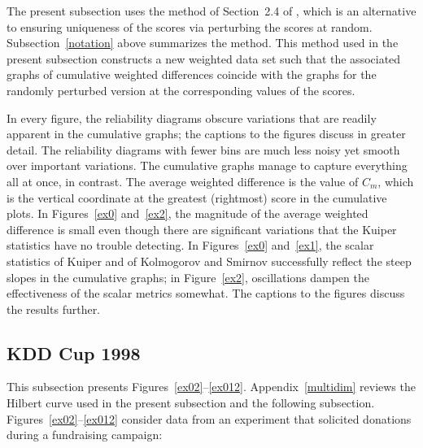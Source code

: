 \documentclass[]{fairmeta}
\begin{document}
The present subsection uses the method of Section~2.4 of \cite{tygert_pvals},
which is an alternative to ensuring uniqueness of the scores via perturbing
the scores at random. Subsection~\ref{notation} above summarizes the method.
This method used in the present subsection constructs a new weighted data set
such that the associated graphs of cumulative weighted differences coincide
with the graphs for the randomly perturbed version at the corresponding values
of the scores.

In every figure, the reliability diagrams obscure variations
that are readily apparent in the cumulative graphs;
the captions to the figures discuss in greater detail.
The reliability diagrams with fewer bins are much less noisy
yet smooth over important variations.
The cumulative graphs manage to capture everything all at once, in contrast.
The average weighted difference is the value of $C_m$,
which is the vertical coordinate at the greatest (rightmost) score
in the cumulative plots. In Figures~\ref{ex0} and~\ref{ex2},
the magnitude of the average weighted difference is small even though there are
significant variations that the Kuiper statistics have no trouble detecting.
In Figures~\ref{ex0} and~\ref{ex1}, the scalar statistics
of Kuiper and of Kolmogorov and Smirnov successfully reflect
the steep slopes in the cumulative graphs;
in Figure~\ref{ex2}, oscillations dampen the effectiveness
of the scalar metrics somewhat.
The captions to the figures discuss the results further.


\subsection{KDD Cup 1998}
\label{kddcup}

This subsection presents Figures~\ref{ex02}--\ref{ex012}.
Appendix~\ref{multidim} reviews the Hilbert curve used
in the present subsection and the following subsection.
Figures~\ref{ex02}--\ref{ex012} consider data from an experiment
that solicited donations during a fundraising campaign:
\end{document}
